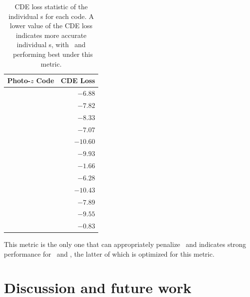 \begin{table}  %
	\centering
	\caption{CDE loss statistic of the individual \pzpdf s for each code.
		A lower value of the CDE loss indicates more accurate individual \pzpdf s, with \cmnn\ and \flexzboost\ performing best under this metric.}
	\begin{tabular}{lr}
		\hline
		Photo-$z$ Code & CDE Loss \\
		\hline
		\annz 	    & $-6.88$ \\
		\bpz 		    & $-7.82$ \\
		\delight    & $-8.33$\\
		\eazy       & $-7.07$ \\
		\flexzboost & $-10.60$\\
		\gpz		    & $-9.93$ \\
		\lephare 	  & $-1.66$ \\
		\metaphor 	& $-6.28$ \\
		\cmnn       & $-10.43$ \\
		\skynet 	  & $-7.89$ \\
		\tpz 		    & $-9.55$ \\
		\hline
		\trainz		  & $-0.83$ \\
	\end{tabular}
\end{table}

This metric is the only one that can appropriately penalize \trainz\ and indicates strong performance for \cmnn\ and \flexzboost, the latter of which is optimized for this metric.

\section{Discussion and future work}


